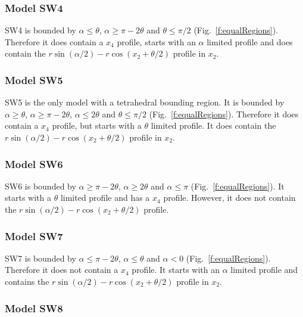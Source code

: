 \subsubsection{Model SW4} \label{SW4}

SW4 is bounded by $\alpha \le \theta$, $\alpha \ge \pi - 2\theta$ and $\theta \le \pi/2$ (Fig.~\ref{f:equalRegions}). Therefore it does contain a $x_4$ profile, starts with an $\alpha$ limited profile and does contain the $r\sin(\alpha/2) - r\cos(x_2 + \theta/2)$ profile in $x_2$.



\subsubsection{Model SW5} \label{SW5}

SW5 is the only model with a tetrahedral bounding region. It is bounded by $\alpha \ge \theta$, $\alpha \ge \pi - 2\theta$, $\alpha \le 2\theta$ and $\theta \le \pi/2$ (Fig.~\ref{f:equalRegions}). Therefore it does contain a $x_4$ profile, but starts with a $\theta$ limited profile. It does contain the $r\sin(\alpha/2) - r\cos(x_2 + \theta/2)$ profile in $x_2$.



\subsubsection{Model SW6} \label{SW6}

SW6 is bounded by $\alpha \ge \pi - 2\theta$,  $\alpha \ge 2\theta$ and $\alpha \le \pi$ (Fig.~\ref{f:equalRegions}). It starts with a $\theta$ limited profile and has a $x_4$ profile. However, it does not contain the $r\sin(\alpha/2) - r\cos(x_2 + \theta/2)$ profile.




\subsubsection{Model SW7} \label{SW7}

SW7 is bounded by $\alpha \le \pi - 2\theta$, $\alpha \le \theta$ and $\alpha < 0$ (Fig.~\ref{f:equalRegions}). Therefore it does not contain a $x_4$ profile. It starts with an $\alpha$ limited profile and contains the $r\sin(\alpha/2) - r\cos(x_2 + \theta/2)$ profile in $x_2$.




\subsubsection{Model SW8} \label{SW8}

